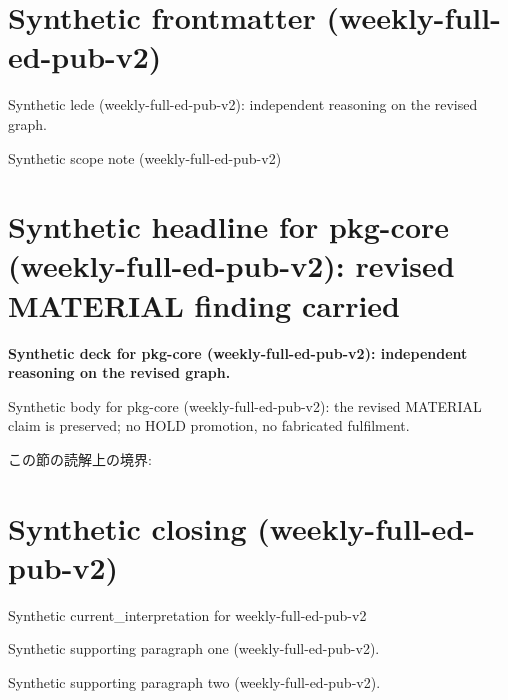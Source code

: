 \documentclass[lualatex,a4paper,10pt]{jlreq}
\begin{document}
\surveycover
\clearpage
\section*{Synthetic frontmatter (weekly-full-ed-pub-v2)}
Synthetic lede (weekly-full-ed-pub-v2): independent reasoning on the revised graph.

\begin{claimboundary}
\noindent Synthetic scope note (weekly-full-ed-pub-v2)\par
\end{claimboundary}
\clearpage
\twocolumn
\section{Synthetic headline for pkg-core (weekly-full-ed-pub-v2): revised MATERIAL finding carried}
\label{pkg:pkg-core}
\noindent\textbf{Synthetic deck for pkg-core (weekly-full-ed-pub-v2): independent reasoning on the revised graph.} \cite{w2026-W33target-source}\par\medskip
\noindent Synthetic body for pkg-core (weekly-full-ed-pub-v2): the revised MATERIAL claim is preserved; no HOLD promotion, no fabricated fulfilment.\par\medskip
\begin{claimboundary}
この節の読解上の境界: 
\end{claimboundary}
\clearpage
\onecolumn
\section{Synthetic closing (weekly-full-ed-pub-v2)}
\label{sec:issue-summary}
\noindent Synthetic current\_interpretation for weekly-full-ed-pub-v2\par\medskip
\noindent Synthetic supporting paragraph one (weekly-full-ed-pub-v2).\par\medskip
\noindent Synthetic supporting paragraph two (weekly-full-ed-pub-v2).\par\medskip
\clearpage
\onecolumn
\printbibliography[title={References / Source Notes}]
\end{document}
